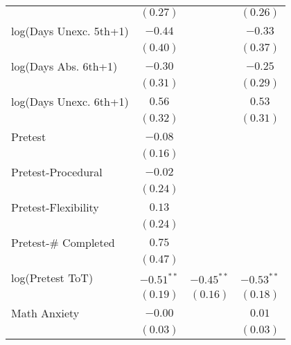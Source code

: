 \begin{center}
\begin{longtable}{l c c c}
                                                   & $(0.27)$     &               & $(0.26)$     \\
log(Days Unexc. 5th+1)                                     & $-0.44$      &               & $-0.33$      \\
                                                   & $(0.40)$     &               & $(0.37)$     \\
log(Days Abs. 6th+1)                                        & $-0.30$      &               & $-0.25$      \\
                                                   & $(0.31)$     &               & $(0.29)$     \\
log(Days Unexc. 6th+1)                                     & $0.56$       &               & $0.53$       \\
                                                   & $(0.32)$     &               & $(0.31)$     \\
Pretest                             & $-0.08$      &               &              \\
                                                   & $(0.16)$     &               &              \\
Pretest-Procedural                                  & $-0.02$      &               &              \\
                                                   & $(0.24)$     &               &              \\
Pretest-Flexibility                                  & $0.13$       &               &              \\
                                                   & $(0.24)$     &               &              \\
Pretest-\# Completed                           & $0.75$       &               &              \\
                                                   & $(0.47)$     &               &              \\
log(Pretest ToT)                         & $-0.51^{**}$ & $-0.45^{**}$  & $-0.53^{**}$ \\
                                                   & $(0.19)$     & $(0.16)$      & $(0.18)$     \\
Math Anxiety                              & $-0.00$      &               & $0.01$       \\
                                                   & $(0.03)$     &               & $(0.03)$     \\

\end{longtable}
\end{center}
